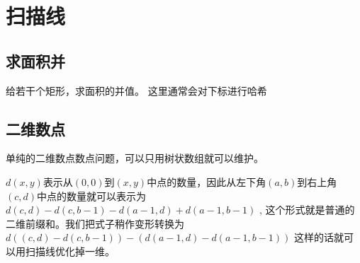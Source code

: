 \section{扫描线}

\subsection{求面积并}
给若干个矩形，求面积的并值。 这里通常会对下标进行哈希


\subsection{二维数点}

单纯的二维数点数点问题，可以只用树状数组就可以维护。

$d(x,y)$表示从$(0,0)$到$(x,y)$中点的数量，因此从左下角$(a,b)$到右上角$(c,d)$中点的数量就可以表示为$d(c,d) - d(c,b-1) - d(a-1,d) + d( a-1,b-1)$ , 这个形式就是普通的二维前缀和。我们把式子稍作变形转换为$d((c,d) - d(c,b-1)) - (d(a-1,d) - d(a-1,b-1))$ 这样的话就可以用扫描线优化掉一维。


